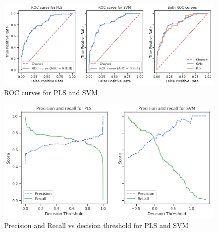 \documentclass[shortabstract, english, mgr]{iithesis}
\begin{document}
\begin{figure}
\centering
\includegraphics[width=1.05\textwidth]{images/rocTest.png}
\caption{ROC curves for PLS and SVM}
\label{fig:rocTest}
\end{figure}

\begin{figure}
\centering
\includegraphics[width=1.05\textwidth]{images/PRvsThresh.png}
\caption{Precision and Recall vs decision threshold for PLS and SVM}
\label{fig:thresholds}
\end{figure}
\end{document}
